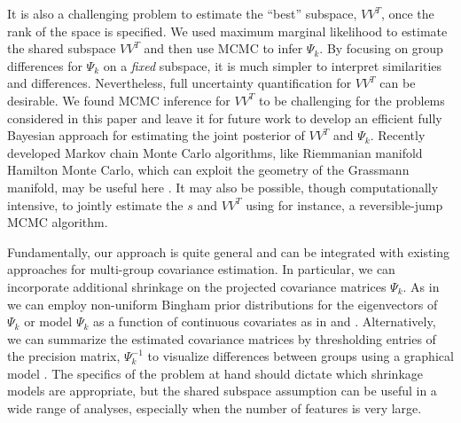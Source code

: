 \documentclass[12pt]{article}
\begin{document}
It is also a challenging problem to estimate the ``best'' subspace,
$VV^T$, once the rank of the space is specified.  We used maximum
marginal likelihood to estimate the shared subspace $VV^T$ and then
use MCMC to infer $\Psi_k$.  By focusing on
group differences for $\Psi_k$ on a \emph{fixed} subspace, it is much
simpler to interpret similarities and differences.  Nevertheless, full
uncertainty quantification for $VV^T$ can be desirable.  We found
MCMC inference for $VV^T$ to be challenging for the problems considered
in this paper and leave it for future work to develop an efficient
fully Bayesian approach for estimating the joint posterior of $VV^T$ and $\Psi_k$.
Recently developed Markov chain Monte Carlo algorithms, like Riemmanian manifold
Hamilton Monte Carlo, which can exploit the geometry of the Grassmann
manifold, may be useful here \citep{Byrne2013, Girolami2011}.  It may
also be possible, though computationally intensive, to jointly
estimate the $s$ and $VV^T$ using for instance, a
reversible-jump MCMC algorithm.


Fundamentally, our approach is quite general and can be integrated
with existing approaches for multi-group covariance
estimation.  In particular, we can incorporate additional shrinkage on
the projected covariance matrices $\Psi_k$.  As in \citet{Hoff2009} we
can employ non-uniform Bingham prior distributions for the
eigenvectors of $\Psi_k$ or model $\Psi_k$ as a function of continuous
covariates as in \citet{Yin2010} and \citet{Hoff2011}.  Alternatively, we can
summarize the estimated covariance matrices by thresholding entries of
the precision matrix, $\Psi_k^{-1}$ to visualize differences between
groups using a graphical model \citep{Meinshausen2006}.  The specifics
of the problem at hand should dictate which shrinkage models are
appropriate, but the shared subspace assumption can be useful in a
wide range of analyses, especially when the number of features is very
large.





\end{document}
